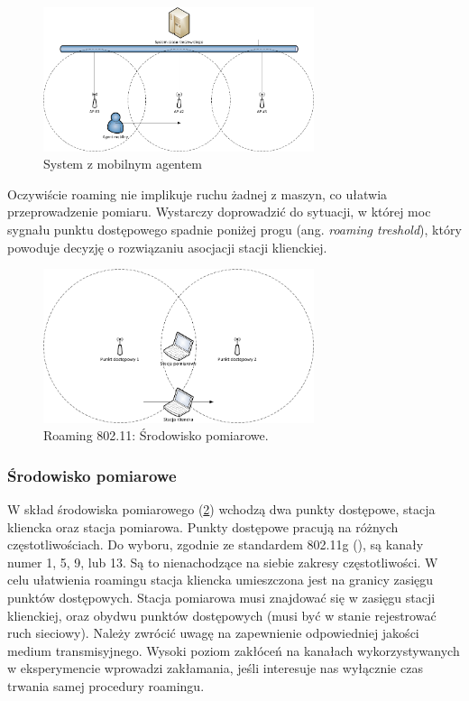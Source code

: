 \begin{figure}[htb]
\begin{center}
\includegraphics[width=300px]{img/System_czasu_rzeczywistego}
\caption{System z mobilnym agentem}
\label{MobileAgentSystem}
\end{center}
\end{figure}

Oczywiście roaming nie implikuje ruchu żadnej z maszyn, co ułatwia przeprowadzenie pomiaru. Wystarczy doprowadzić do sytuacji, w której moc sygnału punktu dostępowego spadnie poniżej progu (ang. \emph{roaming treshold}), który powoduje decyzję o rozwiązaniu asocjacji stacji klienckiej. 

\begin{figure}[htb]
\begin{center}
\includegraphics[width=300px]{img/Roaming}
\caption{Roaming 802.11: Środowisko pomiarowe.}
\label{RoamingEnviroment}
\end{center}
\end{figure}

\subsubsection{Środowisko pomiarowe}

W skład środowiska pomiarowego (\ref{RoamingEnviroment}) wchodzą dwa punkty dostępowe, stacja kliencka oraz stacja pomiarowa. Punkty dostępowe pracują na różnych częstotliwościach. Do wyboru, zgodnie ze standardem 802.11g (\cite{std:IEEE80211}), są kanały numer 1, 5, 9, lub 13. Są to nienachodzące na siebie zakresy częstotliwości. W celu ułatwienia roamingu stacja kliencka umieszczona jest na granicy zasięgu punktów dostępowych. Stacja pomiarowa musi znajdować się w zasięgu stacji klienckiej, oraz obydwu punktów dostępowych (musi być w stanie rejestrować ruch sieciowy). 
Należy zwrócić uwagę na zapewnienie odpowiedniej jakości medium transmisyjnego. Wysoki poziom zakłóceń na kanałach wykorzystywanych w eksperymencie wprowadzi zakłamania, jeśli interesuje nas wyłącznie czas trwania samej procedury roamingu. 


